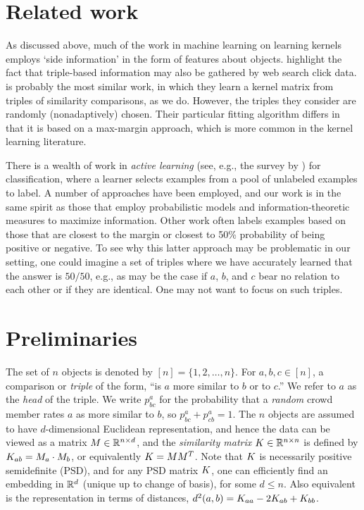 \documentclass{article}
\begin{document}
\section{Related work}

As discussed above, much of the work in machine learning on learning kernels employs `side information' in the form of features about objects.  \citet{Schultz03} highlight the fact that triple-based information may also be gathered by web search click data.
\citet{Agarwal07} is probably the most similar work, in which they learn a kernel matrix from triples of similarity comparisons, as we do.  However, the triples they consider are randomly (nonadaptively) chosen.  Their particular fitting algorithm differs in that it is based on a max-margin approach, which is more common in the kernel learning literature.

There is a wealth of work in {\em active learning} (see, e.g., the survey by \citealp{Settles09}) for classification, where a learner selects examples from a pool of unlabeled examples to label.  A number of approaches have been employed, and our work is in the same spirit as those that employ probabilistic models and information-theoretic measures to maximize information.  Other work often labels examples based on those that are closest to the margin or closest to 50\% probability of being positive or negative.  To see why this latter approach may be problematic in our setting, one could imagine a set of triples where we have accurately learned that the answer is $50/50$, e.g., as may be the case if $a$, $b$, and $c$ bear no relation to each other or if they are identical.  One may not want to focus on such triples.

\section{Preliminaries}\label{sec:prelim}

The set of $n$ objects is denoted by $[n]=\{1,2,\ldots,n\}$.  For $a,b,c \in [n]$, a comparison or {\em triple} of the form, ``is $a$ more similar to $b$ or to $c$.'' We refer to $a$ as the {\em head} of the triple.  We write $p^a_{bc}$ for the probability that a {\em random} crowd member rates $a$ as more similar to $b$, so $p^a_{bc}+p^a_{cb}=1$.
The $n$ objects are assumed to have $d$-dimensional Euclidean representation, and hence the data can be viewed as a matrix $M \in \reals^{n \times d}$, and the {\em similarity matrix} $\S \in \reals^{n \times n}$ is defined by $\S_{ab}=M_a\cdot M_b$, or equivalently $\S = MM^T$.  Note that $\S$ is necessarily positive semidefinite (PSD), and for any PSD matrix $\S$, one can efficiently find an embedding in $\reals^d$ (unique up to change of basis), for some $d \leq n$.  Also equivalent is the representation in terms of distances, $d^2(a,b)=\S_{aa}-2\S_{ab}+\S_{bb}$.
\end{document}
